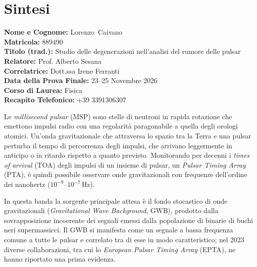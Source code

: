 \documentclass[12pt]{report}
\newcommand{\cognomeIT}{Caivano}
\newcommand{\nomeIT}{Lorenzo}
\newcommand{\matricolaIT}{889490}
\newcommand{\titoloTesiIT}{Studio delle degenerazioni nell'analisi del rumore delle pulsar}
\newcommand{\relatoreIT}{Prof. Alberto Sesana}
\newcommand{\correlatoreIT}{Dott.ssa Irene Ferranti}
\newcommand{\dataSedutaIT}{23--25 Novembre 2026}
\newcommand{\corsoDiLaureaIT}{Fisica}
\newcommand{\recapitoTelefonicoIT}{+39 3391306307}
\begin{document}
\thispagestyle{empty}

\chapter*{Sintesi}
\begin{center}
\textbf{Nome e Cognome:} \nomeIT \, \cognomeIT \\[0.3cm]
\textbf{Matricola:} \matricolaIT \\[0.3cm]
\textbf{Titolo (trad.):} \titoloTesiIT \\[0.3cm]
\textbf{Relatore:} \relatoreIT \\[0.3cm]
\textbf{Correlatrice:} \correlatoreIT \\[0.3cm]
\textbf{Data della Prova Finale:} \dataSedutaIT \\[0.3cm]
\textbf{Corso di Laurea:} \corsoDiLaureaIT \\[0.3cm]
\textbf{Recapito Telefonico:} \recapitoTelefonicoIT \\
\end{center}

\vspace{1cm}
\sloppy

\noindent
Le \textit{millisecond pulsar} (MSP) sono stelle di neutroni in rapida rotazione che
emettono impulsi radio con una regolarità paragonabile a quella degli orologi
atomici. Un'onda gravitazionale che attraversa lo spazio tra la Terra e una pulsar
perturba il tempo di percorrenza degli impulsi, che arrivano leggermente in
anticipo o in ritardo rispetto a quanto previsto. Monitorando per decenni i
\textit{times of arrival} (TOA) degli impulsi di un insieme di pulsar, un
\textit{Pulsar Timing Array} (PTA), è quindi possibile osservare onde gravitazionali
con frequenze dell'ordine dei nanohertz ($10^{-9}$--$10^{-7}$\,Hz). \par

In questa banda la sorgente principale attesa è il fondo stocastico di onde
gravitazionali (\textit{Gravitational Wave Background}, GWB), prodotto dalla
sovrapposizione incoerente dei segnali emessi dalla popolazione di binarie di buchi
neri supermassicci. Il GWB si manifesta come un segnale a bassa frequenza comune a
tutte le pulsar e correlato tra di esse in modo caratteristico; nel 2023 diverse
collaborazioni, tra cui lo \textit{European Pulsar Timing Array} (EPTA), ne hanno
riportato una prima evidenza. \par
\end{document}
